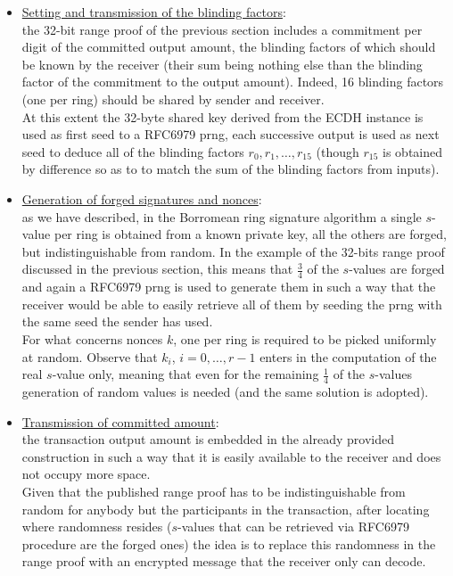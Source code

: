 \begin{itemize}[leftmargin=*]
\item \underline{Setting and transmission of the blinding factors}:\\
the 32-bit range proof of the previous section includes a commitment per digit of the committed output amount, the blinding factors of which should be known by the receiver (their sum being nothing else than the blinding factor of the commitment to the output amount). Indeed, 16 blinding factors (one per ring) should be shared by sender and receiver.\\ 
At this extent the 32-byte shared key derived from the ECDH instance is used as first seed to a RFC6979 prng, each successive output is used as next seed to deduce all of the blinding factors $r_0, r_1, \dots, r_{15}$ (though $r_{15}$ is obtained by difference so as to to match the sum of the blinding factors from inputs).
\item \underline{Generation of forged signatures and nonces}:\\
as we have described, in the Borromean ring signature algorithm a single $s$-value per ring is obtained from a known private key, all the others are forged, but indistinguishable from random. In the example of the 32-bits range proof discussed in the previous section, this means that $\frac{3}{4}$ of the $s$-values are forged and again a RFC6979 prng is used to generate them in such a way that the receiver would be able to easily retrieve all of them by seeding the prng with the same seed the sender has used. \\
For what concerns nonces $k$, one per ring is required to be picked uniformly at random. Observe that $k_i$, $i = 0, \dots, r-1$ enters in the computation of the real $s$-value only, meaning that even for the remaining $\frac{1}{4}$ of the $s$-values generation of random values is needed (and the same solution is adopted).
\item \underline{Transmission of committed amount}:\\
the transaction output amount is embedded in the already provided construction in such a way that it is easily available to the receiver and does not occupy more space.\\
Given that the published range proof has to be indistinguishable from random for anybody but the participants in the transaction, after locating where randomness resides ($s$-values that can be retrieved via RFC6979 procedure are the forged ones) the idea is to replace this randomness in the range proof with an encrypted message that the receiver only can decode.\\

\end{itemize}
